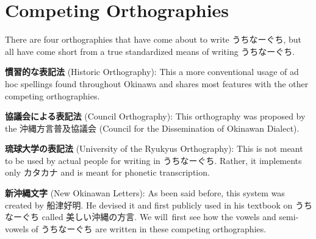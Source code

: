 \section{Competing Orthographies}
 
\par{ There are four orthographies that have come about to write うちなーぐち, but all have come short from a true standardized means of writing うちなーぐち. }

\par{\textbf{慣習的な表記法 }(Historic Orthography): This a more conventional usage of ad hoc spellings found throughout Okinawa and shares most features with the other competing orthographies. }

\par{\textbf{協議会による表記法 }(Council Orthography): This orthography was proposed by the 沖縄方言普及協議会 (Council for the Dissemination of Okinawan Dialect). }

\par{\textbf{琉球大学の表記法 }(University of the Ryukyus Orthography): This is not meant to be used by actual people for writing in うちなーぐち. Rather, it implements only カタカナ and is meant for phonetic transcription. }

\par{\textbf{新沖縄文字 }(New Okinawan Letters): As been said before, this system was created by 船津好明. He devised it and first publicly used in his textbook on うちなーぐち called 美しい沖縄の方言. We will first see how the vowels and semi-vowels of うちなーぐち are written in these competing orthographies. }


